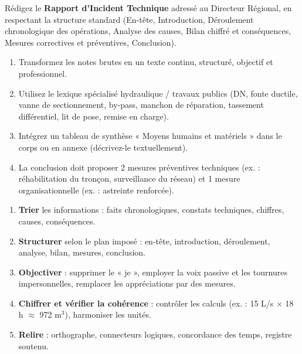 \documentclass[11pt]{article}
\begin{document}
\begin{exercice}
Rédigez le \textbf{Rapport d'Incident Technique} adressé au Directeur Régional, en respectant la structure standard (En-tête, Introduction, Déroulement chronologique des opérations, Analyse des causes, Bilan chiffré et conséquences, Mesures correctives et préventives, Conclusion).
\begin{enumerate}
\item Transformez les notes brutes en un texte continu, structuré, objectif et professionnel.
\item Utilisez le lexique spécialisé hydraulique / travaux publics (DN, fonte ductile, vanne de sectionnement, by-pass, manchon de réparation, tassement différentiel, lit de pose, remise en charge).
\item Intégrez un tableau de synthèse « Moyens humains et matériels » dans le corps ou en annexe (décrivez-le textuellement).
\item La conclusion doit proposer 2 mesures préventives techniques (ex. : réhabilitation du tronçon, surveillance du réseau) et 1 mesure organisationnelle (ex. : astreinte renforcée).
\end{enumerate}
\end{exercice}

\begin{methode}
\begin{enumerate}
\item \textbf{Trier} les informations : faits chronologiques, constats techniques, chiffres, causes, conséquences.
\item \textbf{Structurer} selon le plan imposé : en-tête, introduction, déroulement, analyse, bilan, mesures, conclusion.
\item \textbf{Objectiver} : supprimer le « je », employer la voix passive et les tournures impersonnelles, remplacer les appréciations par des mesures.
\item \textbf{Chiffrer et vérifier la cohérence} : contrôler les calculs (ex. : 15 L/s $\times$ 18 h $\approx$ 972 m$^3$), harmoniser les unités.
\item \textbf{Relire} : orthographe, connecteurs logiques, concordance des temps, registre soutenu.
\end{enumerate}
\end{methode}
\end{document}
